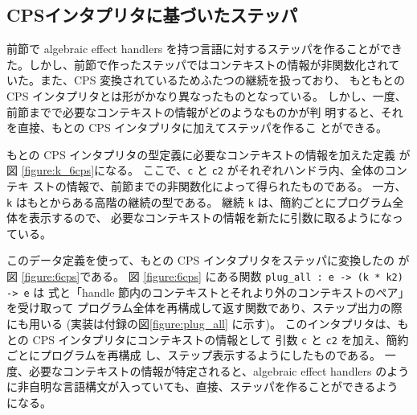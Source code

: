 \subsection{CPSインタプリタに基づいたステッパ}

前節で algebraic effect handlers を持つ言語に対するステッパを作ることができ
た。しかし、前節で作ったステッパではコンテキストの情報が非関数化されて
いた。また、CPS 変換されているためふたつの継続を扱っており、
もともとの CPS インタプリタとは形がかなり異なったものとなっている。
しかし、一度、前節までで必要なコンテキストの情報がどのようなものかが判
明すると、それを直接、もとの CPS インタプリタに加えてステッパを作るこ
とができる。

もとの CPS インタプリタの型定義に必要なコンテキストの情報を加えた定義
が図 \ref{figure:k_6cps}になる。
ここで、\texttt{c} と \texttt{c2} がそれぞれハンドラ内、全体のコンテキ
ストの情報で、前節までの非関数化によって得られたものである。
一方、\texttt{k} はもとからある高階の継続の型である。
継続 \texttt{k} は、簡約ごとにプログラム全体を表示するので、
必要なコンテキストの情報を新たに引数に取るようになっている。

このデータ定義を使って、もとの CPS インタプリタをステッパに変換したの
が図 \ref{figure:6cps}である。
図 \ref{figure:6cps} にある関数 \texttt{plug\_all :\ e -> (k * k2) -> e} は
式と「handle 節内のコンテキストとそれより外のコンテキストのペア」を受け取って
プログラム全体を再構成して返す関数であり、ステップ出力の際にも用いる
(実装は付録の図\ref{figure:plug_all} に示す)。
このインタプリタは、もとの CPS インタプリタにコンテキストの情報として
引数 \texttt{c} と \texttt{c2} を加え、簡約ごとにプログラムを再構成
し、ステップ表示するようにしたものである。
一度、必要なコンテキストの情報が特定されると、algebraic effect handlers のよう
に非自明な言語構文が入っていても、直接、ステッパを作ることができるよう
になる。
